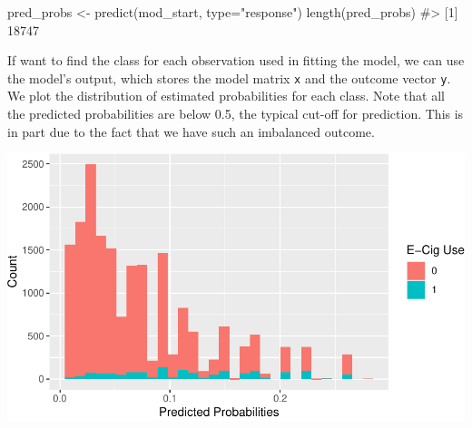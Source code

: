 \documentclass[
  letterpaper,
]{krantz}
\makeatletter
\newenvironment{Shaded}{\begin{snugshade}}{\end{snugshade}}
\newcommand{\AttributeTok}[1]{\textcolor[rgb]{0.40,0.45,0.13}{#1}}
\newcommand{\CommentTok}[1]{\textcolor[rgb]{0.37,0.37,0.37}{#1}}
\newcommand{\DecValTok}[1]{\textcolor[rgb]{0.68,0.00,0.00}{#1}}
\newcommand{\FunctionTok}[1]{\textcolor[rgb]{0.28,0.35,0.67}{#1}}
\newcommand{\NormalTok}[1]{\textcolor[rgb]{0.00,0.23,0.31}{#1}}
\newcommand{\OtherTok}[1]{\textcolor[rgb]{0.00,0.23,0.31}{#1}}
\newcommand{\SpecialCharTok}[1]{\textcolor[rgb]{0.37,0.37,0.37}{#1}}
\newcommand{\StringTok}[1]{\textcolor[rgb]{0.13,0.47,0.30}{#1}}
\newenvironment{kframe}{%
\medskip{}
\setlength{\fboxsep}{.8em}
 \def\at@end@of@kframe{}%
 \ifinner\ifhmode%
  \def\at@end@of@kframe{\end{minipage}}%
  \begin{minipage}{\columnwidth}%
 \fi\fi%
 \def\FrameCommand##1{\hskip\@totalleftmargin \hskip-\fboxsep
 \colorbox{shadecolor}{##1}\hskip-\fboxsep
     \hskip-\linewidth \hskip-\@totalleftmargin \hskip\columnwidth}%
 \MakeFramed {\advance\hsize-\width
   \@totalleftmargin\z@ \linewidth\hsize
   \@setminipage}}%
 {\par\unskip\endMakeFramed%
 \at@end@of@kframe}
\renewenvironment{Shaded}{\begin{kframe}}{\end{kframe}}
\makeatother
\begin{document}
\begin{Shaded}
\begin{Highlighting}[]
\NormalTok{pred\_probs }\OtherTok{\textless{}{-}} \FunctionTok{predict}\NormalTok{(mod\_start, }\AttributeTok{type=}\StringTok{"response"}\NormalTok{)}
\FunctionTok{length}\NormalTok{(pred\_probs)}
\CommentTok{\#\textgreater{} [1] 18747}
\end{Highlighting}
\end{Shaded}

If want to find the class for each observation used in fitting the
model, we can use the model's output, which stores the model matrix
\texttt{x} and the outcome vector \texttt{y}. We plot the distribution
of estimated probabilities for each class. Note that all the predicted
probabilities are below 0.5, the typical cut-off for prediction. This is
in part due to the fact that we have such an imbalanced outcome.

\begin{Shaded}
\end{Shaded}

\begin{center}
\includegraphics[width=1\textwidth,height=\textheight]{book/logistic_regression_files/figure-pdf/unnamed-chunk-9-1.pdf}
\end{center}
\end{document}
